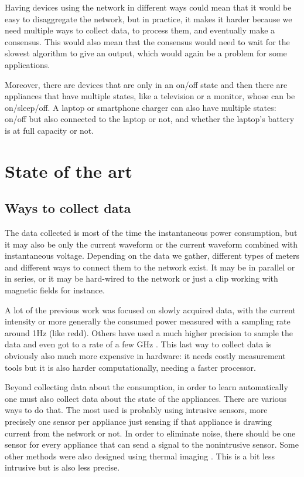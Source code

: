 Having devices using the network in different ways could mean that it would be easy to disaggregate the network, but in practice, it makes it harder because we need multiple ways to collect data, to process them, and eventually make a consensus. This would also mean that the consensus would need to wait for the slowest algorithm to give an output, which would again be a problem for some applications.

Moreover, there are devices that are only in an on/off state and then there are appliances that have multiple states, like a television or a monitor, whose can be on/sleep/off. A laptop or smartphone charger can also have multiple states: on/off but also connected to the laptop or not, and whether the laptop's battery is at full capacity or not.

\section{State of the art}
\subsection{Ways to collect data}
The data collected is most of the time the instantaneous power consumption, but it may also be only the current waveform or the current waveform combined with instantaneous voltage. Depending on the data we gather, different types of meters and different ways to connect them to the network exist. It may be in parallel or in series, or it may be hard-wired to the network or just a clip working with magnetic fields for instance.

A lot of the previous work was focused on slowly acquired data, with the current intensity or more generally the consumed power measured with a sampling rate around 1Hz (like \acrshort{redd}\cite{kolter2011redd}). Others have used a much higher precision to sample the data and even got to a rate of a few GHz \cite{gupta2010electrisense}. This last way to collect data is obviously also much more expensive in hardware: it needs costly measurement tools but it is also harder computationally, needing a faster processor.

Beyond collecting data about the consumption, in order to learn automatically one must also collect data about the state of the appliances. There are various ways to do that. The most used is probably using intrusive sensors, more precisely one sensor per appliance just sensing if that appliance is drawing current from the network or not. In order to eliminate noise, there should be one sensor for every appliance that can send a signal to the nonintrusive sensor.
Some other methods were also designed using thermal imaging \cite{ho2011heatprobe}. This is a bit less intrusive but is also less precise.

